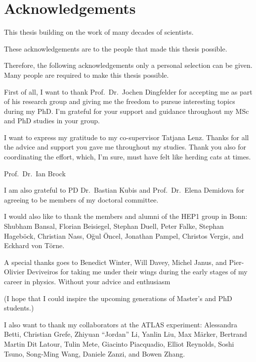\chapter*{Acknowledgements}

This thesis building on the work of many decades of scientists.

These acknowledgements are to the people that made this thesis possible.

Therefore, the following acknowledgements only a personal selection can be
given. Many people are required to make this thesis possible.




First of all, I want to thank Prof.\ Dr.\ Jochen Dingfelder for accepting me as
part of his research group and giving me the freedom to pursue interesting
topics during my PhD. I'm grateful for your support and guidance throughout my
MSc and PhD studies in your group.

I want to express my gratitude to my co-supervisor Tatjana Lenz. Thanks for all
the advice and support you gave me throughout my studies. Thank you also for
coordinating the \bbtautau effort, which, I'm sure, must have felt like herding
cats at times.


Prof.\ Dr.\ Ian Brock

I am also grateful to PD Dr.\ Bastian Kubis and Prof.\ Dr.\ Elena Demidova for
agreeing to be members of my doctoral committee.

I would also like to thank the members and alumni of the \textsc{HEP1} group in
Bonn: Shubham Bansal, Florian Beisiegel, Stephan Duell, Peter Falke, Stephan
Hageböck, Christian Nass, Oğul Öncel, Jonathan Pampel, Christos Vergis, and
Eckhard von Törne.

A special thanks goes to Benedict Winter, Will Davey, Michel Janus, and
Pier-Olivier Deviveiros for taking me under their wings during the early stages
of my career in physics. Without your advice and enthusiasm

(I hope that I could inspire the upcoming generations of Master's and PhD
students.)

I also want to thank my collaborators at the ATLAS experiment: Alessandra Betti,
Christian Grefe, Zhiyuan ``Jordan'' Li, Yanlin Liu, Max Märker, Bertrand Martin
Dit Latour, Tulin Mete, Giacinto Piacquadio, Elliot Reynolds, Soshi Tsuno,
Song-Ming Wang, Daniele Zanzi, and Bowen Zhang.

